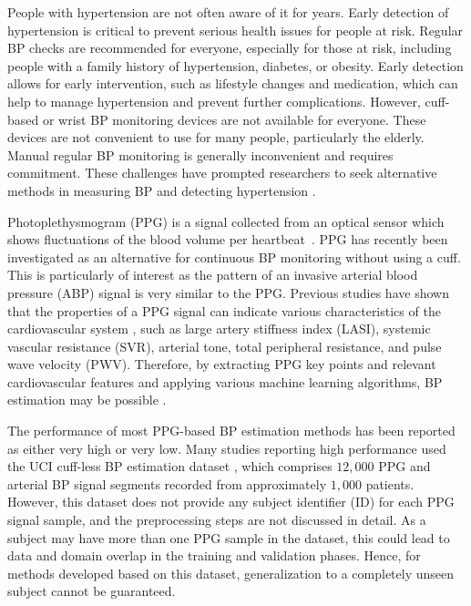 \documentclass[letterpaper, 10 pt, conference]{ieeeconf}
\begin{document}
People with hypertension are not often aware of it for years. Early detection of hypertension is critical to prevent serious health issues for people at risk. Regular BP checks are recommended for everyone, especially for those at risk, including people with a family history of hypertension, diabetes, or obesity. Early detection allows for early intervention, such as lifestyle changes and medication, which can help to manage hypertension and prevent further complications. However, cuff-based or wrist BP monitoring devices are not available for everyone. These devices are not convenient to use for many people, particularly the elderly. Manual regular BP monitoring is generally inconvenient and requires commitment. These challenges have prompted researchers to seek alternative methods in measuring BP and detecting hypertension \cite{zhao2023emerging}.

Photoplethysmogram (PPG) is a signal collected from an optical sensor which shows fluctuations of the blood volume per heartbeat~\cite{hasanzadeh2023multi}. PPG has recently been investigated as an alternative for continuous BP monitoring without using a cuff. This is particularly of interest as the pattern of an invasive arterial blood pressure (ABP) signal is very similar to the PPG. 
Previous studies have shown that the properties of a PPG signal can indicate various characteristics of the cardiovascular system  \cite{padilla2006assessment, wang2009noninvasive}, such as large artery stiffness index (LASI), systemic vascular resistance (SVR), arterial tone, total peripheral resistance, and pulse wave velocity (PWV). Therefore, by extracting PPG key points and relevant cardiovascular features and applying various machine learning algorithms, BP estimation may be possible \cite{kachuee2016cuffless, aguet2023blood}.

The performance of most PPG-based BP estimation methods has been reported as either very high or very low. Many studies reporting high performance used the UCI cuff-less BP estimation dataset \cite{kachuee2016cuffless}, which comprises $12,000$ PPG and arterial BP signal segments recorded from approximately $1,000$ patients. However, this dataset does not provide any subject identifier (ID) for each PPG signal sample, and the preprocessing steps are not discussed in detail. As a subject may have more than one PPG sample in the dataset, this could lead to data and domain overlap in the training and validation phases. Hence, for methods developed based on this dataset, generalization to a completely unseen subject cannot be guaranteed.
\end{document}
